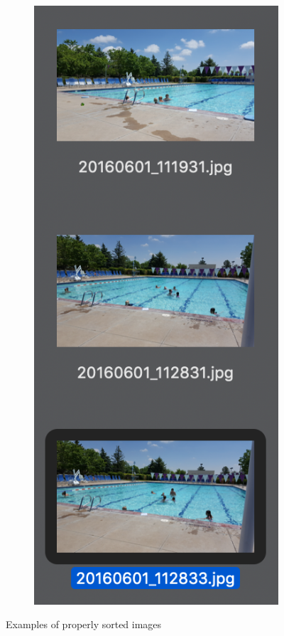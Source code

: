 \documentclass[12pt]{article}
\begin{document}
\begin{figure}[H]
\begin{subfigure}[b]{.3\textwidth}
		\includegraphics[width=.7\textwidth]{images/correct_match_4.png}
	\end{subfigure}

	\caption{Examples of properly sorted images}
	\label{fig:correct_sort}
\end{figure}
\end{document}

